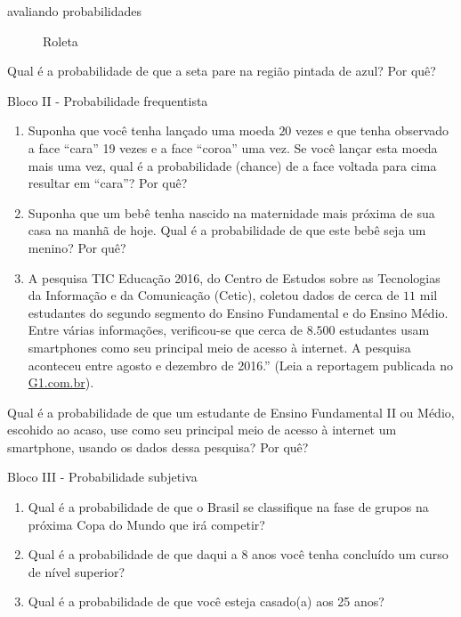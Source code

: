 \begin{task}{avaliando probabilidades}
\begin{enumerate}
\begin{figure}[H]
\begin{tikzpicture}[scale=.75]
\end{tikzpicture}
\caption{Roleta}
\label{roleta}
\end{figure}


\end{enumerate}

Qual é a probabilidade de que a seta pare na região pintada de azul? Por quê?

Bloco II - Probabilidade frequentista
\begin{enumerate}
\item {} 
Suponha que você tenha lançado uma moeda $20$ vezes e que tenha observado a face “cara”{} 19 vezes e a face “coroa”{} uma vez. Se você lançar esta moeda mais uma vez, qual é a probabilidade (chance) de a face voltada para cima resultar em “cara”? Por quê?

\item {} 
Suponha que um bebê tenha nascido na maternidade mais próxima de sua casa na manhã de hoje. Qual é a probabilidade de que este bebê seja um menino? Por quê?

\item {} 
A pesquisa TIC Educação 2016, do Centro de Estudos sobre as Tecnologias da Informação e da Comunicação (Cetic), coletou dados de cerca de $11$ mil estudantes do segundo segmento do Ensino Fundamental e do Ensino Médio. Entre várias informações, verificou-se que cerca de $8.500$ estudantes usam smartphones como seu principal meio de acesso à internet. A pesquisa aconteceu entre agosto e dezembro de 2016.”{} (Leia a reportagem publicada no \href{https://g1.globo.com/educacao/noticia/52-das-instituicoes-de-educacao-basica-usam-celular-em-atividades-escolares-aponta-estudo-da-cetic.ghtml}{G1.com.br}).

\end{enumerate}

Qual é a probabilidade de que um estudante de Ensino Fundamental II ou Médio, escohido ao acaso, use como seu principal meio de acesso à internet um smartphone, usando os dados dessa pesquisa? Por quê?

Bloco III - Probabilidade subjetiva
\begin{enumerate}
\item {} 
Qual é a probabilidade de que o Brasil se classifique na fase de grupos na próxima Copa do Mundo que irá competir?

\item {} 
Qual é a probabilidade de que daqui a 8 anos você tenha concluído um curso de nível superior?

\item {} 
Qual é a probabilidade de que você esteja casado(a) aos 25 anos?

\end{enumerate}
\end{task}


